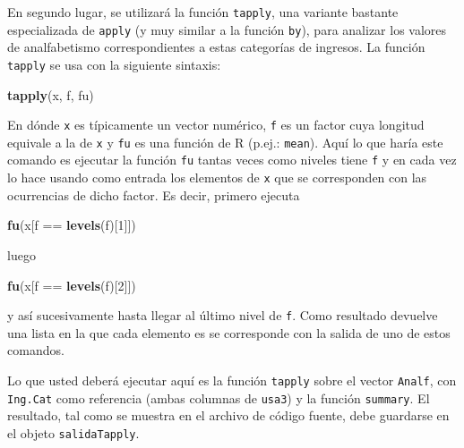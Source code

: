 \documentclass[]{article}
\newenvironment{Shaded}{}{}
\newcommand{\KeywordTok}[1]{\textcolor[rgb]{0.00,0.44,0.13}{\textbf{{#1}}}}
\newcommand{\DecValTok}[1]{\textcolor[rgb]{0.25,0.63,0.44}{{#1}}}
\newcommand{\NormalTok}[1]{{#1}}
\begin{document}
\begin{Shaded}
\end{Shaded}
En segundo lugar, se utilizará la función \texttt{tapply}, una variante
bastante especializada de \texttt{apply} (y muy similar a la función
\texttt{by}), para analizar los valores de analfabetismo
correspondientes a estas categorías de ingresos. La función
\texttt{tapply} se usa con la siguiente sintaxis:

\begin{Shaded}
\begin{Highlighting}[]
\KeywordTok{tapply}\NormalTok{(x, f, fu)}
\end{Highlighting}
\end{Shaded}
En dónde \texttt{x} es típicamente un vector numérico, \texttt{f} es un
factor cuya longitud equivale a la de \texttt{x} y \texttt{fu} es una
función de R (p.ej.: \texttt{mean}). Aquí lo que haría este comando es
ejecutar la función \texttt{fu} tantas veces como niveles tiene
\texttt{f} y en cada vez lo hace usando como entrada los elementos de
\texttt{x} que se corresponden con las ocurrencias de dicho factor. Es
decir, primero ejecuta

\begin{Shaded}
\begin{Highlighting}[]
\KeywordTok{fu}\NormalTok{(x[f == }\KeywordTok{levels}\NormalTok{(f)[}\DecValTok{1}\NormalTok{]])}
\end{Highlighting}
\end{Shaded}
luego

\begin{Shaded}
\begin{Highlighting}[]
\KeywordTok{fu}\NormalTok{(x[f == }\KeywordTok{levels}\NormalTok{(f)[}\DecValTok{2}\NormalTok{]])}
\end{Highlighting}
\end{Shaded}
y así sucesivamente hasta llegar al último nivel de \texttt{f}. Como
resultado devuelve una lista en la que cada elemento es se corresponde
con la salida de uno de estos comandos.

Lo que usted deberá ejecutar aquí es la función \texttt{tapply} sobre el
vector \texttt{Analf}, con \texttt{Ing.Cat} como referencia (ambas
columnas de \texttt{usa3}) y la función \texttt{summary}. El resultado,
tal como se muestra en el archivo de código fuente, debe guardarse en el
objeto \texttt{salidaTapply}.
\end{document}
